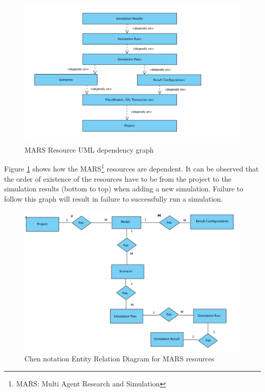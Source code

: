         \begin{figure}[H]
            \centering \includegraphics[scale=0.6]{grafiken/marsDependency.png}
            \caption{MARS Resource UML dependency graph}
            \label{fig:marsDependency}
        \end{figure}
        
        Figure \ref{fig:marsDependency} shows how the MARS\footnote{MARS: Multi Agent Research and Simulation} 
        resources are dependent. It can be observed
        that the order of existence of the resources have to be from the project to the simulation results 
        (bottom to top) when adding a new simulation. Failure to follow this graph will result in failure to
        successfully run a simulation.

        \begin{figure}[H]
            \centering \includegraphics[scale=0.6]{grafiken/ERMars.png}
            \caption{Chen notation Entity Relation Diagram for MARS resources}
            \label{fig:ERMars}
        \end{figure}
        
